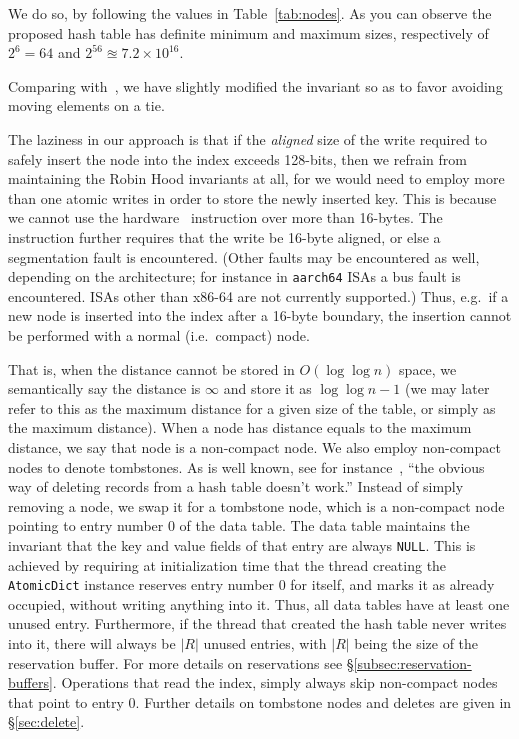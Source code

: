 We do so, by following the values in Table~\ref{tab:nodes}.
As you can observe the proposed hash table has definite minimum and maximum sizes, respectively of $2^{6} = 64$ and $2^{56} \approxeq 7.2 \times 10^{16}$.


Comparing with~\cite{robin-hood}, we have slightly modified the invariant so as to favor avoiding moving elements on a tie.

The laziness in our approach is that if the \emph{aligned} size of the write required to safely insert the node into the index exceeds 128-bits, then we refrain from maintaining the Robin Hood invariants at all, for we would need to employ more than one atomic writes in order to store the newly inserted key.
This is because we cannot use the hardware~\cite[CMPXCHG--Compare and Exchange]{x86-64} instruction over more than 16-bytes.
The instruction further requires that the write be 16-byte aligned, or else a segmentation fault is encountered.
(Other faults may be encountered as well, depending on the architecture; for instance in \texttt{aarch64} ISAs a bus fault is encountered.
ISAs other than x86-64 are not currently supported.)
Thus, e.g.\ if a new node is inserted into the index after a 16-byte boundary, the insertion cannot be performed with a normal (i.e.\ compact) node.

That is, when the distance cannot be stored in $O(\log \log n)$ space, we semantically say the distance is $\infty$ and store it as $\log \log n - 1$ (we may later refer to this as the maximum distance for a given size of the table, or simply as the maximum distance).
When a node has distance equals to the maximum distance, we say that node is a non-compact node.
We also employ non-compact nodes to denote tombstones.
As is well known, see for instance~\cite[\S6.4]{the-art-vol-2}, ``the obvious way of deleting records from a hash table doesn't work.''
Instead of simply removing a node, we swap it for a tombstone node, which is a non-compact node pointing to entry number 0 of the data table.
The data table maintains the invariant that the key and value fields of that entry are always \texttt{NULL}.
This is achieved by requiring at initialization time that the thread creating the \texttt{AtomicDict} instance reserves entry number 0 for itself, and marks it as already occupied, without writing anything into it.
Thus, all data tables have at least one unused entry.
Furthermore, if the thread that created the hash table never writes into it, there will always be $|R|$ unused entries, with $|R|$ being the size of the reservation buffer.
For more details on reservations see \S\ref{subsec:reservation-buffers}.
Operations that read the index, simply always skip non-compact nodes that point to entry 0.
Further details on tombstone nodes and deletes are given in \S\ref{sec:delete}.

